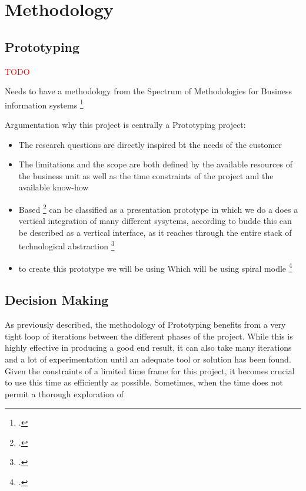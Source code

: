 \chapter{Methodology}
\label{methodology}

\section{Prototyping}

\textcolor{red}{TODO}

Needs to have a methodology from the Spectrum of Methodologies for Business information systems \footcite{wildeMethodenspektrumWirtschaftsinformatikUeberblick}


Argumentation why this project is centrally a Prototyping project:

\begin{itemize}
    \item  The research questions are directly inspired bt the needs of the customer
    \item   The limitations and the scope are both defined by the available resources of the business unit as well as the time constraints of the project and the available know-how
    \item Based \footcite[p. 91]{buddeWhatPrototyping1992} can be classified as a presentation prototype in which we do a  does a vertical integration of many different sysytems, according to budde this can be described as a vertical interface, as it reaches through the entire stack of technological abstraction \footcite[p. 94]{buddeWhatPrototyping1992}    \
    \item to create this prototype we will be using  Which  will be using spiral modle \footcite{boehmSpiralModelSoftware1988} 
\end{itemize} 

\newpage


\section{Decision Making}
\label{decision_making}

As previously described, the methodology of Prototyping benefits from a very tight loop of iterations between the different phases of the project.
While this is highly effective in producing a good end result, it can also take many iterations and a lot of experimentation until an adequate tool or solution has been found.
Given the constraints of a limited time frame for this project, it becomes crucial to use this time as efficiently as possible.
Sometimes, when the time does not permit a thorough exploration of 

